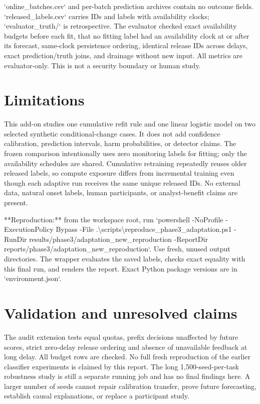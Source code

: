 \documentclass[11pt,a4paper]{article}
\begin{document}
`online\_batches.csv` and per-batch prediction archives contain no outcome fields. `released\_labels.csv` carries IDs and labels with availability clocks; `evaluator\_truth/` is retrospective. The evaluator checked exact availability budgets before each fit, that no fitting label had an availability clock at or after its forecast, same-clock persistence ordering, identical release IDs across delays, exact prediction/truth joins, and drainage without new input. All metrics are evaluator-only. This is not a security boundary or human study.\par

\section{Limitations}

This add-on studies one cumulative refit rule and one linear logistic model on two selected synthetic conditional-change cases. It does not add confidence calibration, prediction intervals, harm probabilities, or detector claims. The frozen comparison intentionally uses zero monitoring labels for fitting; only the availability schedules are shared. Cumulative retraining repeatedly reuses older released labels, so compute exposure differs from incremental training even though each adaptive run receives the same unique released IDs. No external data, natural onset labels, human participants, or analyst-benefit claims are present.\par

**Reproduction:** from the workspace root, run `powershell -NoProfile -ExecutionPolicy Bypass -File .\textbackslash{}scripts\textbackslash{}reproduce\_phase3\_adaptation.ps1 -RunDir results/phase3/adaptation\_new\_reproduction -ReportDir reports/phase3/adaptation\_new\_reproduction`. Use fresh, unused output directories. The wrapper evaluates the saved labels, checks exact equality with this final run, and renders the report. Exact Python package versions are in `environment.json`.\par


\section{Validation and unresolved claims}

The audit extension tests equal quotas, prefix decisions unaffected by future scores, strict zero-delay release ordering and absence of unavailable feedback at long delay. All budget rows are checked. No full fresh reproduction of the earlier classifier experiments is claimed by this report. The long 1,500-seed-per-task robustness study is still a separate running job and has no final findings here. A larger number of seeds cannot repair calibration transfer, prove future forecasting, establish causal explanations, or replace a participant study.\par
\end{document}

